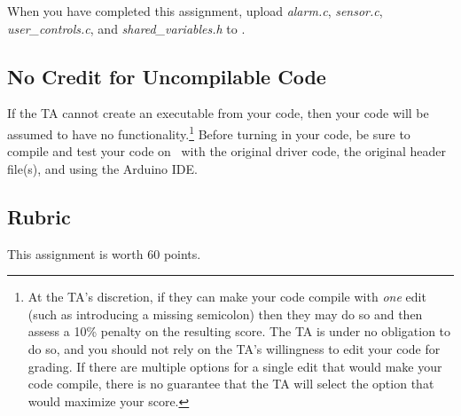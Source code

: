 When you have completed this assignment, upload \textit{alarm.c}, \textit{sensor.c}, \textit{user\_controls.c}, and \textit{shared\_variables.h} to \filesubmission.

\subsection*{No Credit for Uncompilable Code}
If the TA cannot create an executable from your code, then your code will be assumed to have no functionality.\footnote{
    At the TA's discretion, if they can make your code compile with \textit{one} edit (such as introducing a missing semicolon) then they may do so and then assess a 10\% penalty on the resulting score.
    The TA is under no obligation to do so, and you should not rely on the TA's willingness to edit your code for grading.
    If there are multiple options for a single edit that would make your code compile, there is no guarantee that the TA will select the option that would maximize your score.
}
Before turning in your code, be sure to compile and test your code on \runtimeenvironment\ with the original driver code, the original header file(s), and using the Arduino IDE\@.

\interruptlablatepolicy

\subsection*{Rubric}

This assignment is worth 60 points.

